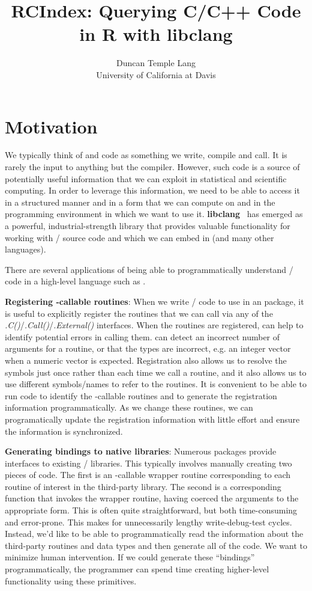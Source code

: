 \documentclass[article]{jss}
\author{Duncan Temple Lang\\University of California at Davis}
\title{RCIndex: Querying C/C++ Code in R with libclang}
\def\C{\proglang{C}}
\def\Cpp{\proglang{C$++$}}
\def\R{\proglang{R}}
\def\Rfunc#1{\textsl{#1()}}
\def\libclang{\textbf{libclang}}
\begin{document}

\section{Motivation}\label{sec:Introduction}

We typically think of \C{} and \Cpp{} code as something we write,
compile and call. It is rarely the input to anything but the compiler.
However, such code is a source of potentially useful information that
we can exploit in statistical and scientific computing.  
In order to
leverage this information, we need to be able to access it in a
structured manner and in a form that we can compute on and in the
programming environment in which we want to use it.
\libclang{}~\citep{bib:libclang,bib:libclangSlides} has
emerged as a powerful, industrial-strength library that provides
valuable functionality for working with \C/\Cpp{} source code and which
we can embed in \R{} (and many other languages).

There are several applications of being able to programmatically
understand \C/\Cpp{} code in a high-level language such as \R.

\textbf{Registering \R-callable routines}: When we write \C/\Cpp{}
code to use in an \R{} package, it is useful to explicitly register
the routines that we can call via any of the
\Rfunc{.C}/\Rfunc{.Call}/\Rfunc{.External} interfaces.  When the
routines are registered, \R{} can help to identify potential errors in
calling them.  \R{} can detect an incorrect number of arguments for a
routine, or that the types are incorrect, e.g. an integer vector when
a numeric vector is expected. Registration also allows us to resolve
the symbols just once rather than each time we call a routine, and it
also allows us to use different symbols/names to refer to the routines.  It
is convenient to be able to run \R{} code to identify the \R-callable
routines and to generate the registration information
programmatically.  As we change these routines, we can programatically
update the registration information with little effort and ensure the
information is synchronized.


\textbf{Generating bindings to native libraries}: Numerous \R{}
packages provide interfaces to existing \C/\Cpp{} libraries.  This
typically involves manually creating two pieces of code. The first is
an \R-callable wrapper routine corresponding to each routine of
interest in the third-party library. The second is a corresponding
\R{} function that invokes the wrapper routine, having coerced the
\R{} arguments to the appropriate form.  This is often quite
straightforward, but both time-consuming and error-prone.  This makes
for unnecessarily lengthy write-debug-test cycles.  Instead, we'd like
to be able to programmatically read the information about the
third-party routines and data types and then generate all of the code.
We want to minimize human intervention.  If we could generate these
``bindings'' programmatically, the \R{} programmer can spend time
creating higher-level functionality using these primitives.
\end{document}
